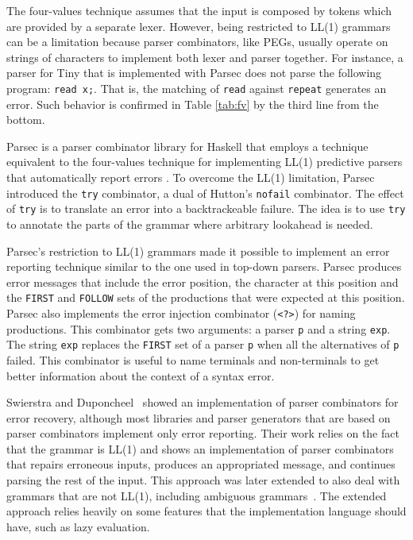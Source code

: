 \documentclass[3p,12pt,singlecolumn]{elsarticle}
\begin{document}
The four-values technique assumes that the input is composed by tokens
which are provided by a separate lexer.
However, being restricted to LL(1) grammars can be a limitation
because parser combinators, like PEGs, usually operate on strings of
characters to implement both lexer and parser together.
For instance, a parser for Tiny that is implemented with Parsec
\cite{leijen2001parsec} does not parse the following program:
\verb'read x;'.
That is, the matching of \verb'read' against \verb'repeat' generates
an error.
Such behavior is confirmed in Table \ref{tab:fv} by the third line
from the bottom.

Parsec is a parser combinator library for Haskell that employs a
technique equivalent to the four-values technique for implementing
LL(1) predictive parsers that automatically report errors
\cite{leijen2001parsec}. To overcome the LL(1) limitation,
Parsec introduced the {\tt try} combinator, a dual of Hutton's
{\tt nofail} combinator. The effect of {\tt try}
is to translate an error into a backtrackeable
failure. The idea is
to use {\tt try} to annotate the parts of the grammar where
arbitrary lookahead is needed. 

Parsec's restriction to LL(1) grammars made it possible to implement
an error reporting technique similar to the one
used in top-down parsers.
Parsec produces error messages that include the error position,
the character at this position and the \texttt{FIRST} and
\texttt{FOLLOW} sets of the
productions that were expected at this position.
Parsec also implements the error injection combinator (\texttt{<?>})
for naming productions.
This combinator gets two arguments: a parser \texttt{p} and a
string \texttt{exp}.
The string \texttt{exp} replaces the \texttt{FIRST} set of a
parser \texttt{p} when all the alternatives of \texttt{p} failed.
This combinator is useful to name terminals and non-terminals to
get better information about the context of a syntax error.

Swierstra and Duponcheel~\cite{swierstra1996dec} showed an
implementation of parser combinators for error recovery,
although most libraries and parser generators that are based
on parser combinators implement only error reporting.
Their work relies on the fact that the grammar is LL(1)
and shows an implementation of parser combinators that
repairs erroneous inputs, produces an appropriated message,
and continues parsing the rest of the input.
This approach was later extended to also deal with grammars
that are not LL(1), including ambiguous grammars~\cite{swierstra2009uuparsing}.
The extended approach relies heavily on some features that the
implementation language should have, such as lazy evaluation.
\end{document}
